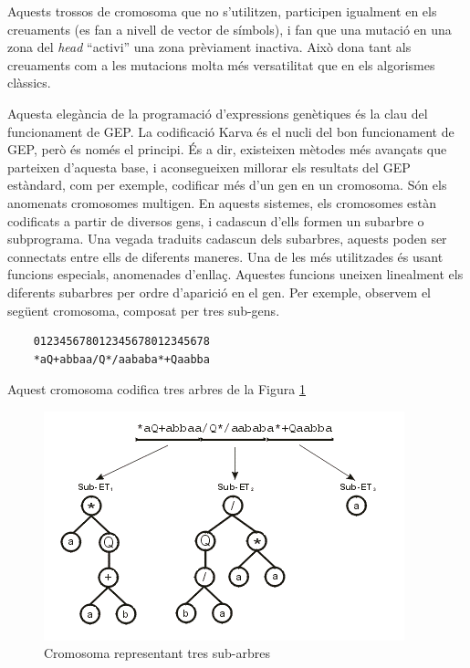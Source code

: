 Aquests trossos de cromosoma que no s'utilitzen, participen igualment en els
creuaments (es fan a nivell de vector de símbols), i fan que una mutació en una
zona del \emph{head} ``activi'' una zona prèviament inactiva.  Això dona tant
als creuaments com a les mutacions molta més versatilitat que en els algorismes
clàssics.

Aquesta elegància de la programació d'expressions genètiques és la clau del
funcionament de GEP.  La codificació Karva és el nucli del bon funcionament de
GEP, però és només el principi.  És a dir, existeixen mètodes més avançats que
parteixen d'aquesta base, i aconsegueixen millorar els resultats del GEP
estàndard, com per exemple, codificar més d'un gen en un cromosoma. Són els
anomenats cromosomes multigen.  En aquests sistemes, els cromosomes estàn
codificats a partir de diversos gens, i cadascun d'ells formen un subarbre o
subprograma.  Una vegada traduits cadascun dels subarbres, aquests poden ser
connectats entre ells de diferents maneres.  Una de les més utilitzades és usant
funcions especials, anomenades d'enllaç. Aquestes funcions uneixen linealment
els diferents subarbres per ordre d'aparició en el gen.  Per exemple, observem
el següent cromosoma, composat per tres sub-gens.

	\begin{center}
	\begin{verbatim}
	012345678012345678012345678 	 
	*aQ+abbaa/Q*/aababa*+Qaabba
	\end{verbatim}
	\end{center}


Aquest cromosoma codifica tres arbres de la Figura \ref{fig:tres sub-et}

\begin{figure}[h!]
\begin{center}
\includegraphics{geptut/pt03a.png}
\end{center}
\caption{Cromosoma representant tres sub-arbres}
\label{fig:tres sub-et}
\end{figure}


